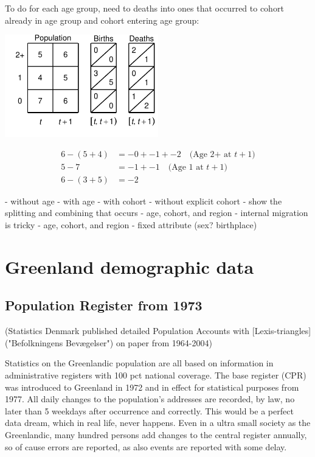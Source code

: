 \documentclass[USenglish]{article}
\begin{document}
To do for each age group, need to deaths into ones that occurred to cohort already in age group and cohort entering age group:
\begin{center}
\includegraphics[width=0.5\textwidth]{figures_accounts/fig_account_withage.pdf}
\end{center}

\begin{align}
    6 - (5 + 4) & = -0 + -1 + -2 \quad \text{(Age 2+ at $t+1$)} \\
    5 - 7 & = -1 + -1 \quad \text{(Age 1 at $t+1$)} \\
    6 - (3 + 5) & = -2    
\end{align}


- without age
- with age
   - with cohort
   - without explicit cohort
- show the splitting and combining that occurs   
- age, cohort, and region
   - internal migration is tricky
- age, cohort, and region - fixed attribute (sex? birthplace)



\section{Greenland demographic data}

\subsection{Population Register from 1973} 

(Statistics Denmark published detailed Population Accounts with [Lexis-triangles]("Befolkningens Bevægelser") on paper from 1964-2004)

Statistics on the Greenlandic population are all based on information in administrative registers with 100 pct national coverage. The base register (CPR) was introduced to Greenland in 1972 and in effect for statistical purposes from 1977. All daily changes to the population’s addresses are recorded, by law, no later than 5 weekdays after occurrence and correctly. This would be a perfect data dream, which in real life, never happens. Even in a ultra small society as the Greenlandic, many hundred persons add changes to the central register annually, so of cause errors are reported, as also events are reported with some delay.
\end{document}
